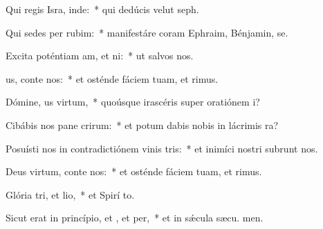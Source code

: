 \item Qui regis Isra, inde:~* qui dedúcis velut  seph.
\item Qui sedes per rubim:~* manifestáre coram Ephraim, Bénjamin,  se.
\item Excita poténtiam am, et ni:~* ut salvos  nos.
\item {}us, conte nos:~* et osténde fáciem tuam, et  rimus.
\item Dómine, us virtum,~* quoúsque irascéris super oratiónem  i?
\item Cibábis nos pane crirum:~* et potum dabis nobis in lácrimis  ra?
\item Posuísti nos in contradictiónem vinis tris:~* et inimíci nostri subrunt nos.
\item Deus virtum, conte nos:~* et osténde fáciem tuam, et  rimus.
\item Glória tri, et lio,~* et Spirí to.
\item Sicut erat in princípio, et , et per,~* et in sǽcula sæcu. men.

